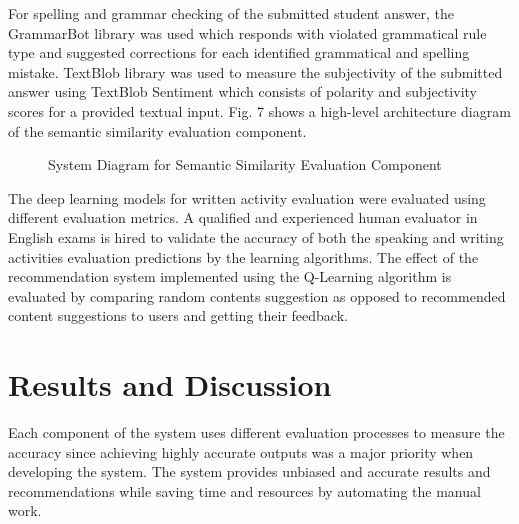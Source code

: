 \documentclass[conference]{IEEEtran}
\begin{document}
For spelling and grammar checking of the submitted student answer, the GrammarBot library was used which responds with violated grammatical rule type and suggested corrections for each identified grammatical and spelling mistake. TextBlob library was used to measure the subjectivity of the submitted answer using TextBlob Sentiment which consists of polarity and subjectivity scores for a provided textual input. Fig. 7 shows a high-level architecture diagram of the semantic similarity evaluation component.

\begin{figure}[htbp]
\centerline{}
\caption{System Diagram for Semantic Similarity Evaluation Component}
\end{figure}

The deep learning models for written activity evaluation were evaluated using different evaluation metrics. A qualified and experienced human evaluator in English exams is hired to validate the accuracy of both the speaking and writing activities evaluation predictions by the learning algorithms. The effect of the recommendation system implemented using the Q-Learning algorithm is evaluated by comparing random contents suggestion as opposed to recommended content suggestions to users and getting their feedback.

\section{Results and Discussion}

Each component of the system uses different evaluation processes to measure the accuracy since achieving highly accurate outputs was a major priority when developing the system. The system provides unbiased and accurate results and recommendations while saving time and resources by automating the manual work.
\end{document}
